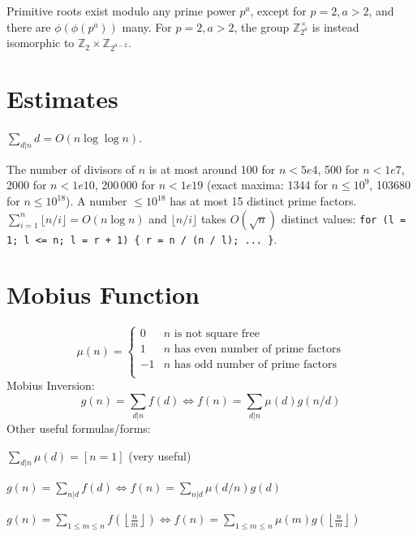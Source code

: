 	Primitive roots exist modulo any prime power $p^a$, except for $p = 2, a > 2$, and there are $\phi(\phi(p^a))$ many.
	For $p = 2, a > 2$, the group $\mathbb Z_{2^a}^\times$ is instead isomorphic to $\mathbb Z_2 \times \mathbb Z_{2^{a-2}}$.

\section{Estimates}
	$\sum_{d|n} d = O(n \log \log n)$.

	The number of divisors of $n$ is at most around 100 for $n < 5e4$, 500 for $n < 1e7$, 2000 for $n < 1e10$, 200\,000 for $n < 1e19$
	(exact maxima: 1344 for $n \le 10^9$, 103680 for $n \le 10^{18}$).
	A number $\le 10^{18}$ has at most 15 distinct prime factors.
	$\sum_{i=1}^n \lfloor n/i \rfloor = O(n \log n)$ and $\lfloor n/i \rfloor$ takes $O(\sqrt n)$
	distinct values: \texttt{for (l = 1; l <= n; l = r + 1) \{ r = n / (n / l); ... \}}.

\section{Mobius Function}
\[
	\mu(n) = \begin{cases} 0 & n \textrm{ is not square free}\\ 1 & n \textrm{ has even number of prime factors}\\ -1 & n \textrm{ has odd number of prime factors}\\\end{cases}
\]
  Mobius Inversion:
  \[ g(n) = \sum_{d|n} f(d) \Leftrightarrow f(n) = \sum_{d|n} \mu(d)g(n/d) \]
  Other useful formulas/forms:

  $ \sum_{d | n} \mu(d) = [ n = 1] $ (very useful)

  $ g(n) = \sum_{n|d} f(d) \Leftrightarrow f(n) = \sum_{n|d} \mu(d/n)g(d)$

 $ g(n) = \sum_{1 \leq m \leq n} f(\left\lfloor\frac{n}{m}\right \rfloor ) \Leftrightarrow f(n) = \sum_{1\leq m\leq n} \mu(m)g(\left\lfloor\frac{n}{m}\right\rfloor)$
